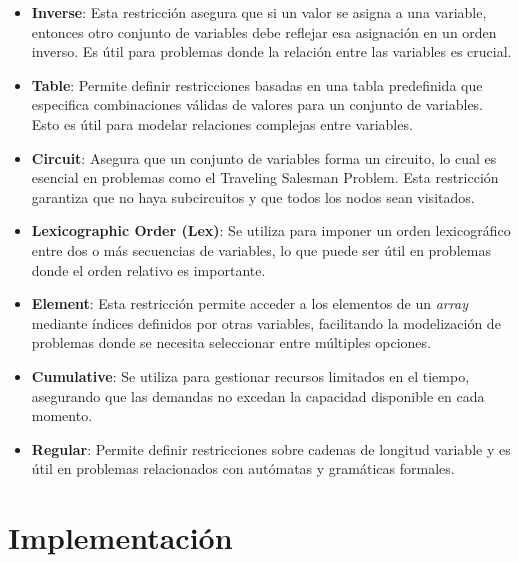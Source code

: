 \documentclass[12pt]{report}
\begin{document}
\begin{itemize}
    \item \textbf{Inverse}: Esta restricción asegura que si un valor se asigna a una variable, entonces otro conjunto de variables debe reflejar esa asignación en un orden inverso. Es útil para problemas donde la relación entre las variables es crucial.
    \item \textbf{Table}: Permite definir restricciones basadas en una tabla predefinida que especifica combinaciones válidas de valores para un conjunto de variables. Esto es útil para modelar relaciones complejas entre variables.
    \item \textbf{Circuit}: Asegura que un conjunto de variables forma un circuito, lo cual es esencial en problemas como el Traveling Salesman Problem. Esta restricción garantiza que no haya subcircuitos y que todos los nodos sean visitados.
    \item \textbf{Lexicographic Order (Lex)}: Se utiliza para imponer un orden lexicográfico entre dos o más secuencias de variables, lo que puede ser útil en problemas donde el orden relativo es importante.
    \item \textbf{Element}: Esta restricción permite acceder a los elementos de un \textit{array} mediante índices definidos por otras variables, facilitando la modelización de problemas donde se necesita seleccionar entre múltiples opciones.
    \item \textbf{Cumulative}: Se utiliza para gestionar recursos limitados en el tiempo, asegurando que las demandas no excedan la capacidad disponible en cada momento.
    \item \textbf{Regular}: Permite definir restricciones sobre cadenas de longitud variable y es útil en problemas relacionados con autómatas y gramáticas formales.
    
\end{itemize}

\chapter{Implementación}
\end{document}
